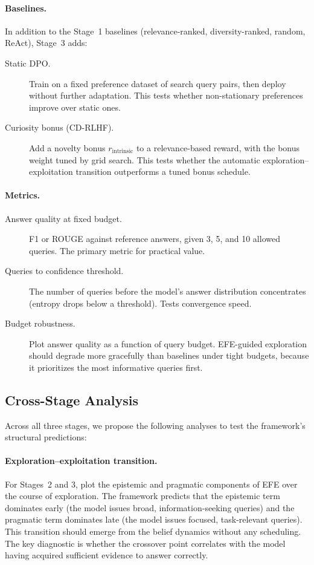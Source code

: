 \documentclass[11pt]{article}
\begin{document}
\paragraph{Baselines.}
In addition to the Stage~1 baselines (relevance-ranked, diversity-ranked, random, ReAct), Stage~3 adds:
\begin{description}
    \item[Static DPO.] Train on a fixed preference dataset of search query pairs, then deploy without further adaptation. This tests whether non-stationary preferences improve over static ones.
    \item[Curiosity bonus (CD-RLHF).] Add a novelty bonus $r_{\mathrm{intrinsic}}$ to a relevance-based reward, with the bonus weight tuned by grid search. This tests whether the automatic exploration--exploitation transition outperforms a tuned bonus schedule.
\end{description}

\paragraph{Metrics.}
\begin{description}
    \item[Answer quality at fixed budget.] F1 or ROUGE against reference answers, given 3, 5, and 10 allowed queries. The primary metric for practical value.
    \item[Queries to confidence threshold.] The number of queries before the model's answer distribution concentrates (entropy drops below a threshold). Tests convergence speed.
    \item[Budget robustness.] Plot answer quality as a function of query budget. EFE-guided exploration should degrade more gracefully than baselines under tight budgets, because it prioritizes the most informative queries first.
\end{description}


\subsection{Cross-Stage Analysis}
\label{sec:exp-analysis}

Across all three stages, we propose the following analyses to test the framework's structural predictions:

\paragraph{Exploration--exploitation transition.}
For Stages~2 and 3, plot the epistemic and pragmatic components of EFE over the course of exploration. The framework predicts that the epistemic term dominates early (the model issues broad, information-seeking queries) and the pragmatic term dominates late (the model issues focused, task-relevant queries). This transition should emerge from the belief dynamics without any scheduling. The key diagnostic is whether the crossover point correlates with the model having acquired sufficient evidence to answer correctly.
\end{document}
